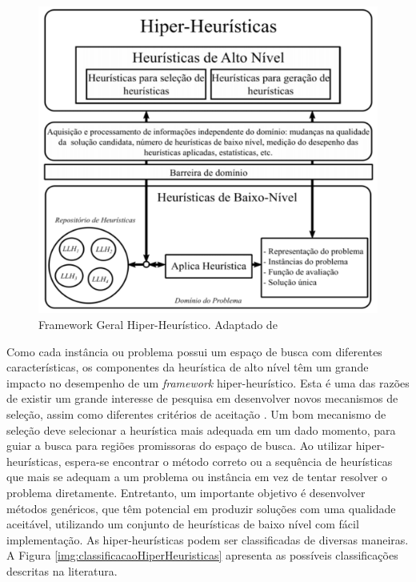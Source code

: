 \begin{figure}[!htb]
	\centering
	\includegraphics{Imagens/HiperHeuristicas.png}
	\caption{Framework Geral Hiper-Heurístico. Adaptado de \cite{sabar2015automatic}}
	\label{img:hiperheuristico}
\end{figure}


Como cada instância ou problema possui um espaço de busca com diferentes características, os componentes da heurística de alto nível têm um grande impacto no desempenho de um \textit{framework} hiper-heurístico. Esta é uma das razões de existir um grande interesse de pesquisa em desenvolver  novos mecanismos de seleção, assim como diferentes critérios de aceitação \cite{burke2013hyper}. Um bom mecanismo de seleção deve selecionar a heurística mais adequada em um dado momento, para guiar a busca para regiões promissoras do espaço de busca. 
Ao utilizar hiper-heurísticas, espera-se encontrar o método correto ou a sequência de heurísticas que mais se adequam a um problema ou instância em vez de tentar resolver o problema diretamente. Entretanto, um importante objetivo é desenvolver métodos genéricos, que têm  potencial em produzir soluções com uma qualidade aceitável, utilizando um conjunto de heurísticas de baixo nível com fácil implementação. As hiper-heurísticas podem ser classificadas de diversas maneiras. A Figura \ref{img:classificacaoHiperHeuristicas} apresenta as possíveis classificações descritas na literatura. 

